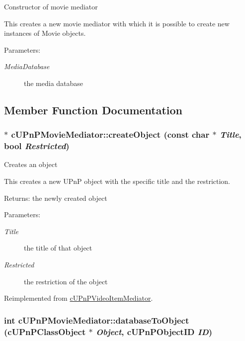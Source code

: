 Constructor of movie mediator

This creates a new movie mediator with which it is possible to create new instances of Movie objects.

\begin{Desc}
\item[Parameters:]
\begin{description}
\item[{\em MediaDatabase}]the media database \end{description}
\end{Desc}


\subsection{Member Function Documentation}
\hypertarget{classcUPnPMovieMediator_29d40a311b7283cc4fba36860ac8c935}{
\subsubsection[{createObject}]{ $\ast$ cUPnPMovieMediator::createObject (const char $\ast$ {\em Title}, \/  bool {\em Restricted})}}
\label{classcUPnPMovieMediator_29d40a311b7283cc4fba36860ac8c935}


Creates an object

This creates a new UPnP object with the specific title and the restriction.

\begin{Desc}
\item[Returns:]the newly created object \end{Desc}
\begin{Desc}
\item[Parameters:]
\begin{description}
\item[{\em Title}]the title of that object \item[{\em Restricted}]the restriction of the object \end{description}
\end{Desc}
  

Reimplemented from \hyperlink{classcUPnPVideoItemMediator_27e001142c3651c36dfd3b7c450414c0}{cUPnPVideoItemMediator}.\hypertarget{classcUPnPMovieMediator_542135e9c1051b57a8f6f5ecc0c1ede3}{
\subsubsection[{databaseToObject}]{\setlength{\rightskip}{0pt plus 5cm}int cUPnPMovieMediator::databaseToObject ({\bf cUPnPClassObject} $\ast$ {\em Object}, \/  {\bf cUPnPObjectID} {\em ID})}}
\label{classcUPnPMovieMediator_542135e9c1051b57a8f6f5ecc0c1ede3}


